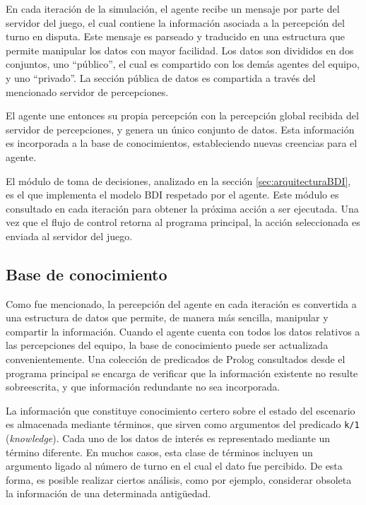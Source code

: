 \documentclass[oneside]{book}
\theoremstyle{definition}
\theoremstyle{example}
\begin{document}
En cada iteración de la simulación, el agente recibe un mensaje por parte del servidor 
del juego, el cual contiene la información asociada a la percepción del turno en disputa. 
Este mensaje es parseado y traducido en una estructura que permite manipular los datos 
con mayor facilidad. Los datos son divididos en dos conjuntos, uno ``público'', el cual 
es compartido con los demás agentes del equipo, y uno ``privado''. La sección pública de 
datos es compartida a través del mencionado servidor de percepciones.

El agente une entonces su propia percepción con la percepción global recibida del servidor 
de percepciones, y genera un único conjunto de datos. Esta información es incorporada a la 
base de conocimientos, estableciendo nuevas creencias para el agente.

El módulo de toma de decisiones, analizado en la sección \ref{sec:arquitecturaBDI}, es el 
que implementa el modelo BDI respetado por el agente. Este módulo es consultado en cada 
iteración para obtener la próxima acción a ser ejecutada. Una vez que el flujo de control 
retorna al programa principal, la acción seleccionada es enviada al servidor del juego.

\subsection{Base de conocimiento}


Como fue mencionado, la percepción del agente en cada iteración es convertida a una 
estructura de datos que permite, de manera más sencilla, manipular y compartir la 
información. Cuando el agente cuenta con todos los datos relativos a las percepciones 
del equipo, la base de conocimiento puede ser actualizada convenientemente. Una colección 
de predicados de Prolog consultados desde el programa principal se encarga de verificar 
que la información existente no resulte sobreescrita, y que información redundante no sea 
incorporada. 

La información que constituye conocimiento certero sobre el estado del escenario es 
almacenada mediante términos, que sirven como argumentos del predicado \texttt{k/1} 
(\textit{knowledge}). Cada uno de los datos de interés es representado mediante un 
término diferente. 
En muchos casos, esta clase de términos incluyen un argumento ligado al número de turno 
en el cual el dato fue percibido. De esta forma, es posible realizar ciertos análisis, 
como por ejemplo, considerar obsoleta la información de una determinada antigüedad.
\end{document}
